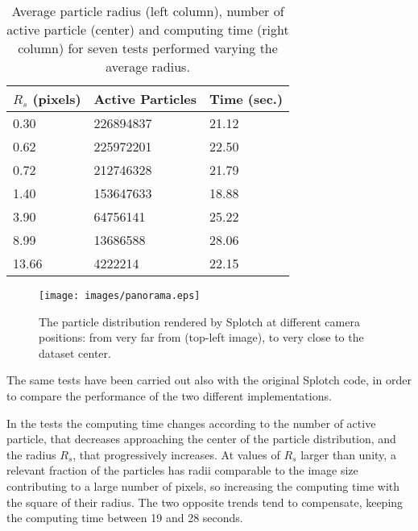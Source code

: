 \documentclass[11pt]{article}
\begin{document}
\begin{table}
\caption{Average particle radius (left column), number of active particle (center)
and computing time (right column) for seven tests performed varying the average radius.}
\begin{center}
\begin{tabular}{|l|l|l|}
\hline
$R_s$ (pixels) & Active Particles & Time (sec.) \\
\hline
0.30   & 226894837  & 21.12 \\
\hline
0.62   & 225972201  & 22.50 \\
\hline
0.72   & 212746328  & 21.79 \\
\hline
1.40   & 153647633  & 18.88 \\
\hline
3.90   & 64756141   & 25.22 \\
\hline
8.99   & 13686588   & 28.06 \\
\hline
13.66  & 4222214    & 22.15 \\
\hline
\end{tabular}
\end{center}
\label{tab:radius}
\end{table}


\begin{figure}
\centering
\texttt{[image: images/panorama.eps]}
\caption{The particle distribution rendered by Splotch at different camera positions: from very 
far from (top-left image), to very close to the dataset center.}
\label{fig:panorama}
\end{figure}

The same tests have been carried out also with the original Splotch code, in order 
to compare the performance of the two different implementations. 

In the tests the computing time changes according
to the number of active particle, that decreases approaching the center of the particle 
distribution, and the radius $R_s$, that progressively increases. At values of 
$R_s$ larger than unity, a relevant fraction of the particles has radii comparable to the image size
contributing to a large number of pixels, so increasing the computing time 
with the square of their radius. The two opposite trends tend to compensate, keeping  
the computing time between 19 and 28 seconds.

\end{document}

